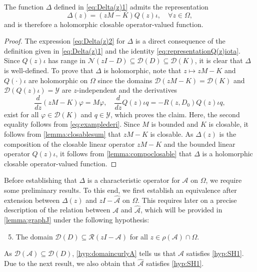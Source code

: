 \documentclass[english]{myarticle}
\begin{document}
\begin{sloppypar}
\begin{corollary} \label{cor:Deltawelldefined}
The function $\Delta$ defined in \eqref{eq:Delta(z)1} admits the representation
\begin{equation} \label{eq:Delta(z)2}
    \Delta(z) = (zM - K)Q(z)\iota, \quad \forall z \in \Omega,
\end{equation}
and is therefore a holomorphic closable operator-valued function.
\end{corollary}
\begin{proof}
The expression \eqref{eq:Delta(z)2} for $\Delta$ is a direct consequence of the definition given in \eqref{eq:Delta(z)1} and the identity \eqref{eq:representationQ(z)iota}. Since $Q(z)\iota$ has range in $\mathcal{N}(zI-D) \subseteq \mathcal{D}(D) \subseteq \mathcal{D}(K)$, it is clear that $\Delta$ is well-defined. To prove that $\Delta$ is holomorphic, note that $z \mapsto zM-K$ and $Q (\cdot)\iota$ are holomorphic on $\Omega$ since the domains $\mathcal{D}(zM-K) = \mathcal{D}(K)$ and $\mathcal{D}(Q(z)\iota) = \mathcal{Y}$ are $z$-independent and the derivatives
\begin{equation*}
    \frac{d}{dz}(zM-K)\varphi = M\varphi, \quad \frac{d}{dz}Q(z)\iota q = - R(z,D_0) Q(z)\iota q,
\end{equation*}
exist for all $\varphi \in \mathcal{D}(K)$ and $q \in \mathcal{Y}$, which proves the claim. Here, the second equality follows from \eqref{eq:examplederi}. Since $M$ is bounded and $K$ is closable, it follows from \cref{lemma:closablesum} that $zM - K$ is closable. As $\Delta(z)$ is the composition of the closable linear operator $zM - K$ and the bounded linear operator $Q(z)\iota$, it follows from \cref{lemma:compoclosable} that $\Delta$ is a holomorphic closable operator-valued function.
\end{proof}

Before establishing that $\Delta$ 
is a characteristic operator for $\mathcal{A}$ on $\Omega$, we require some preliminary results. To this end, we first establish an equivalence after extension between $\Delta(z)$ and $zI - \hat{\mathcal{A}}$ on $\Omega$. This requires later on a precise description of the relation between $\mathcal{A}$ and $\hat{\mathcal{A}}$, which will be provided in \cref{lemma:graphJ} under the following hypothesis:

\begin{enumerate}[label=({H}{{\arabic*}})] 
\setcounter{enumi}{4}
    \item \label{hyp:domaincurlyA} The domain $\mathcal{D}(D) \subseteq \mathcal{R}(zI-\mathcal{A})$ for all $z \in \rho(\mathcal{A}) \cap \Omega$.
\end{enumerate}
As $\mathcal{D}(\mathcal{A}) \subseteq \mathcal{D}(D)$, \ref{hyp:domaincurlyA} tells us that $\mathcal{A}$ satisfies \ref{hyp:SH1}. Due to the next result, we also obtain that $\hat{\mathcal{A}}$ satisfies \ref{hyp:SH1}.


\end{sloppypar}
\end{document}
